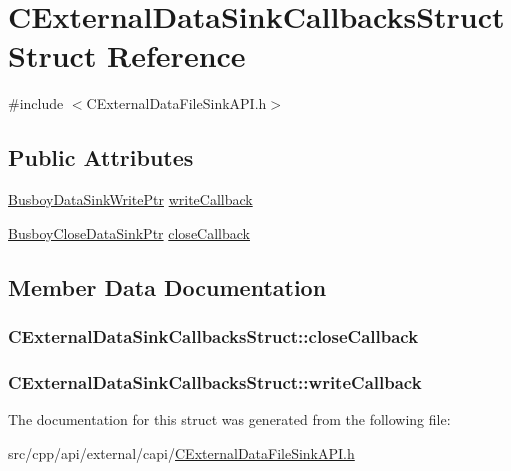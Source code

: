 \hypertarget{structCExternalDataSinkCallbacksStruct}{
\section{CExternalDataSinkCallbacksStruct Struct Reference}
\label{structCExternalDataSinkCallbacksStruct}
}


{\ttfamily \#include $<$CExternalDataFileSinkAPI.h$>$}\subsection*{Public Attributes}
\begin{DoxyCompactItemize}
\item 
\hyperlink{CExternalDataFileSinkAPI_8h_a919dc76385466f410be3edf9c889b6a8}{BusboyDataSinkWritePtr} \hyperlink{structCExternalDataSinkCallbacksStruct_ab2de7247bc18efe953b5985f90be94f2}{writeCallback}
\item 
\hyperlink{CExternalDataFileSinkAPI_8h_a959c9e41234aea76fc99af0a60c6e298}{BusboyCloseDataSinkPtr} \hyperlink{structCExternalDataSinkCallbacksStruct_a9c9e46950dbf7eee33cb8f540d82e6ca}{closeCallback}
\end{DoxyCompactItemize}


\subsection{Member Data Documentation}
\hypertarget{structCExternalDataSinkCallbacksStruct_a9c9e46950dbf7eee33cb8f540d82e6ca}{
\subsubsection[{closeCallback}]{ {\bf CExternalDataSinkCallbacksStruct::closeCallback}}}
\label{structCExternalDataSinkCallbacksStruct_a9c9e46950dbf7eee33cb8f540d82e6ca}
\hypertarget{structCExternalDataSinkCallbacksStruct_ab2de7247bc18efe953b5985f90be94f2}{
\subsubsection[{writeCallback}]{ {\bf CExternalDataSinkCallbacksStruct::writeCallback}}}
\label{structCExternalDataSinkCallbacksStruct_ab2de7247bc18efe953b5985f90be94f2}


The documentation for this struct was generated from the following file:\begin{DoxyCompactItemize}
\item 
src/cpp/api/external/capi/\hyperlink{CExternalDataFileSinkAPI_8h}{CExternalDataFileSinkAPI.h}\end{DoxyCompactItemize}
